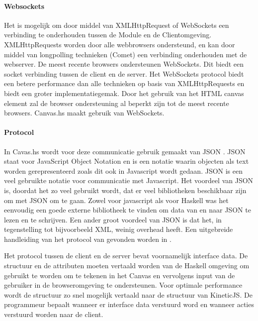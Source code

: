 \paragraph{Websockets}
Het is mogelijk om door middel van XMLHttpRequest of WebSockets een verbinding te onderhouden tussen de Module en de Clientomgeving. XMLHttpRequests worden door alle webbrowsers ondersteund, en kan door middel van longpolling technieken (Comet)  een verbinding onderhouden met de webserver. De meest recente browsers ondersteunen WebSockets. Dit biedt een socket verbinding tussen de client en de server. Het WebSockets protocol biedt een betere performance dan alle technieken op basis van XMLHttpRequests en biedt een groter implementatiegemak. Door het gebruik van het HTML canvas element zal de browser ondersteuning al beperkt zijn tot de meest recente browsers. Canvas.hs maakt gebruik van WebSockets.

\paragraph{Protocol}
In Cavas.hs wordt voor deze communicatie gebruik gemaakt van JSON \cite{JSON2006}. JSON staat voor JavaScript Object Notation en is een notatie waarin objecten als text worden gerepresenteerd zoals dit ook in Javascript wordt gedaan. JSON is een veel gebruikte notatie voor communicatie met Javascript. Het voordeel van JSON is, doordat het zo veel gebruikt wordt, dat er veel bibliotheken beschikbaar zijn om met JSON om te gaan. Zowel voor javascript als voor Haskell was het eenvoudig een goede externe bibliotheek te vinden om data van en naar JSON te lezen en te schrijven. Een ander groot voordeel van JSON is dat het, in tegenstelling tot bijvoorbeeld XML, weinig overhead heeft. Een uitgebreide handleiding van het protocol van gevonden worden in \cite{Protocol2013}.

Het protocol tussen de client en de server bevat voornamelijk interface data. De structuur en de attributen moeten vertaald worden van de Haskell omgeving om gebruikt te worden om te tekenen in het Canvas en vervolgens input van de gebruiker in de browseromgeving te ondersteunen. Voor optimale performance wordt de structuur zo snel mogelijk vertaald naar de structuur van KineticJS. De programmeur bepaalt wanneer er interface data verstuurd word en wanneer acties verstuurd worden naar de client.

